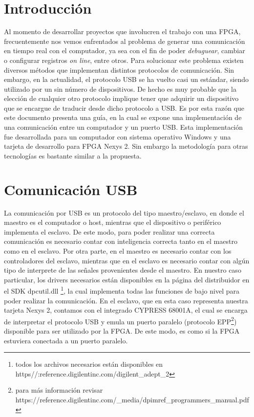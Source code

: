 \documentclass[11pt,letterpaper,spanish]{article}
\begin{document}
\section{Introducción}
Al momento de desarrollar proyectos que involucren el trabajo con una FPGA, frecuentemente nos vemos enfrentados al problema de generar una comunicación en tiempo real con el computador, ya sea con el fin de poder \textit{debuguear}, cambiar o  configurar registros  \textit{on line}, entre otros. Para solucionar este problema existen diversos métodos que implementan distintos protocolos de comunicación. Sin embargo, en la actualidad, el protocolo USB se ha vuelto casi un estándar, siendo utilizado por un sin número de dispositivos. De hecho es muy probable que la elección de cualquier otro protocolo implique tener que adquirir un dispositivo que se encargue de traducir desde dicho protocolo a USB. 
Es por esta razón que este documento presenta una guía, en la cual se expone una implementación de una comunicación entre un computador y un puerto USB. Esta implementación fue desarrollada para un computador con sistema operativo Windows y una tarjeta de desarrollo para FPGA Nexys 2. Sin embargo la metodología para otras tecnologías es bastante similar a la propuesta.


\section{Comunicación USB}
 La comunicación por USB es un protocolo del tipo maestro/esclavo, en donde el maestro es el computador o host, mientras que el dispositivo o  periférico implementa el esclavo. De este modo, para poder realizar una correcta comunicación es necesario contar con inteligencia correcta tanto en el maestro como en el esclavo. Por otra parte, en el maestro es necesario contar con los controladores del esclavo, mientras que  en el esclavo es necesario contar con algún tipo de interprete de las señales provenientes desde el maestro. En nuestro caso particular, los drivers necesarios están disponibles en la página del distribuidor en el SDK dpcutil.dll \footnote{todos los archivos necesarios están disponibles en https//:reference.digilentinc.com/digilent\_adept\_2}, la cual implementa todas las funciones de bajo nivel para poder realizar la comunicación. En el esclavo, que en esta caso representa nuestra tarjeta Nexys 2, contamos con el integrado CYPRESS 68001A, el cual se encarga de interpretar el protocolo USB y emula un puerto paralelo (protocolo EPP\footnote{para más información revisar https://reference.digilentinc.com/\_media/dpimref\_programmers\_manual.pdf}) disponible para ser utilizado por la FPGA. De este modo, es como si la FPGA estuviera conectada a un puerto paralelo.
\end{document}
